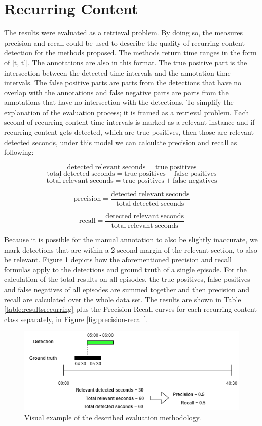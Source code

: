 \documentclass{report}
\begin{document}
\section{Recurring Content}
The results were evaluated as a retrieval problem. By doing so, the measures precision and recall could be used to describe the quality of recurring content detection for the methods proposed. The methods return time ranges in the form of [t, t']. The annotations are also in this format. The true positive part is the intersection between the detected time intervals and the annotation time intervals. The false positive parts are parts from the detections that have no overlap with the annotations and false negative parts are parts from the annotations that have no intersection with the detections. To simplify the explanation of the evaluation process; it is framed as a retrieval problem. Each second of recurring content time intervals is marked as a relevant instance and if recurring content gets detected, which are true positives, then those are relevant detected seconds, under this model we can calculate precision and recall as following:

\[\mathrm{detected\;relevant\;seconds} = \mathrm{true\;positives}\]
\[\mathrm{total\;detected\;seconds = \mathrm{true\;positives} + \mathrm{false\;positives}}\]
\[\mathrm{total\;relevant\;seconds} = \mathrm{true\;positives} + \mathrm{false\;negatives}\]

\[\mathrm{precision} = \frac{\mathrm{detected\;relevant\;seconds}}{\mathrm{total\;detected\;seconds}}\]

\[\mathrm{recall} = \frac{\mathrm{detected\;relevant\;seconds}}{\mathrm{total\;relevant\;seconds}}\]

Because it is possible for the manual annotation to also be slightly inaccurate, we mark detections that are within a 2 second margin of the relevant section, to also be relevant. Figure \ref{fig:evaluation-example} depicts how the aforementioned precision and recall formulas apply to the detections and ground truth of a single episode. For the calculation of the total results on all episodes, the true positives, false positives and false negatives of all episodes are summed together and then precision and recall are calculated over the whole data set. The results are shown in Table \ref{table:resultsrecurring} plus the Precision-Recall curves for each recurring content class separately, in Figure \ref{fig:precision-recall}.

\begin{figure}[H]
	\includegraphics[width=\textwidth]{images/evaluation.png}
	\centering
	\caption{Visual example of the described evaluation methodology.}
	\label{fig:evaluation-example}
\end{figure}
\end{document}
